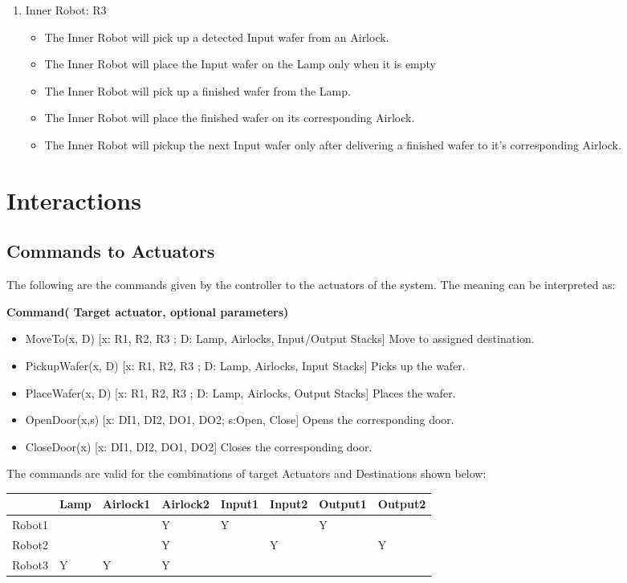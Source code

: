 \documentclass[a4paper,12pt]{article}
\begin{document}
\begin{enumerate}
\item Inner Robot: R3
	\begin{itemize}
	\item The Inner Robot will pick up a detected Input wafer from an Airlock.
	\item The Inner Robot will place the Input wafer on the Lamp only when it is empty
	\item The Inner Robot will pick up a finished wafer from the Lamp.
	\item The Inner Robot will place the finished wafer on its corresponding Airlock.
	\item The Inner Robot will pickup the next Input wafer only after delivering a finished wafer to it's corresponding Airlock.
	\end{itemize}

\end{enumerate}
\fi

\section{Interactions} 
\subsection {Commands to Actuators}
The following are the commands given by the controller to the actuators of the system. The meaning can be interpreted as: \bigskip

\textbf{Command( Target actuator, optional parameters)}
\begin{itemize}
\item MoveTo(x, D) [x: R1, R2, R3 ; D: Lamp, Airlocks, Input/Output Stacks]		Move to assigned destination.	
\item PickupWafer(x, D)															[x: R1, R2, R3 ; D: Lamp, Airlocks, Input Stacks] 					Picks up the wafer.
\item PlaceWafer(x, D) 															[x: R1, R2, R3 ; D: Lamp, Airlocks, Output Stacks]					Places the wafer.
\item OpenDoor(x,s) 																[x: DI1, DI2, DO1, DO2; s:Open, Close]  														Opens the corresponding door.
\item CloseDoor(x) 																[x: DI1, DI2, DO1, DO2]														Closes the corresponding door.
\end{itemize}
The commands are valid for the combinations of target Actuators and Destinations shown below:
\begin{table}[!h]
\centering
{%
\begin{tabular}{l|l|l|l|l|l|l|l|}
\cline{2-8}
                         & Lamp & Airlock1 & Airlock2 & Input1 & Input2 & Output1 & Output2 \\ \hline
\multicolumn{1}{|l|}{Robot1} &   &   & Y   & Y  &    & Y  &    \\ \hline
\multicolumn{1}{|l|}{Robot2} &   &    & Y  &    & Y  &    & Y  \\ \hline
\multicolumn{1}{|l|}{Robot3} & Y & Y  & Y  &    &    &    &    \\ \hline
\end{tabular}%
}
\end{table}
\end{document}
